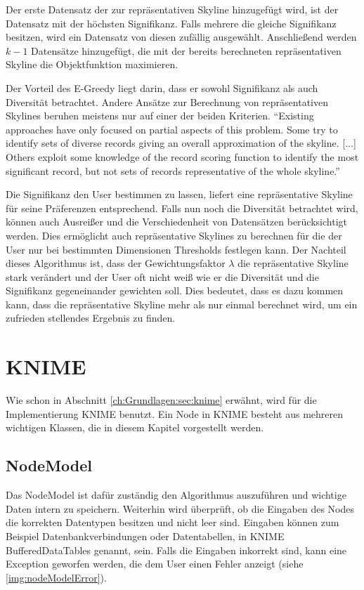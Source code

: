 Der erste Datensatz der zur repräsentativen Skyline hinzugefügt wird, ist der Datensatz mit der höchsten Signifikanz. Falls mehrere die gleiche Signifikanz besitzen, wird ein Datensatz von diesen zufällig ausgewählt.
Anschließend werden $k-1$ Datensätze hinzugefügt, die mit der bereits berechneten repräsentativen Skyline die Objektfunktion maximieren.

Der Vorteil des E-Greedy liegt darin, dass er sowohl Signifikanz als auch Diversität betrachtet. Andere Ansätze zur Berechnung von repräsentativen Skylines beruhen meistens nur auf einer der beiden Kriterien.  
\enquote{Existing approaches have only focused on partial aspects of this problem. Some try to identify sets of diverse records giving an overall approximation of the skyline. [...] Others exploit some knowledge of the record scoring function to identify the most significant record, but not sets of records representative of the whole skyline.} \cite[p. 1]{magnani2014taking}
 
Die Signifikanz den User bestimmen zu lassen, liefert eine repräsentative Skyline für seine Präferenzen entsprechend. Falls nun noch die Diversität betrachtet wird, können auch Ausreißer und die Verschiedenheit von Datensätzen berücksichtigt werden. Dies ermöglicht auch repräsentative Skylines zu berechnen für die der User nur bei bestimmten Dimensionen Thresholds festlegen kann.
Der Nachteil dieses Algorithmus ist, dass der Gewichtungsfaktor $\lambda$ die repräsentative Skyline stark verändert und der User oft nicht weiß wie er die Diversität und die Signifikanz gegeneinander gewichten soll. Dies bedeutet, dass es dazu kommen kann, dass die repräsentative Skyline mehr als nur einmal berechnet wird, um ein zufrieden stellendes Ergebnis zu finden.
\section{KNIME}
\label{ch:Analyse:sec:knime}
Wie schon in Abschnitt \ref{ch:Grundlagen:sec:knime} erwähnt, wird für die Implementierung KNIME benutzt. Ein Node in KNIME besteht aus mehreren wichtigen Klassen, die in diesem Kapitel vorgestellt werden.
\subsection{NodeModel}
\label{ch:Analyse:sec:knime:subsec:nodeModel}
Das NodeModel ist dafür zuständig den Algorithmus auszuführen und wichtige Daten intern zu speichern. 
Weiterhin wird überprüft, ob die Eingaben des Nodes die korrekten Datentypen besitzen und nicht leer sind.
Eingaben können zum Beispiel Datenbankverbindungen oder Datentabellen, in KNIME BufferedDataTables genannt, sein. Falls die Eingaben inkorrekt sind, kann eine Exception geworfen werden, die dem User einen Fehler anzeigt (siehe \ref{img:nodeModelError}).

